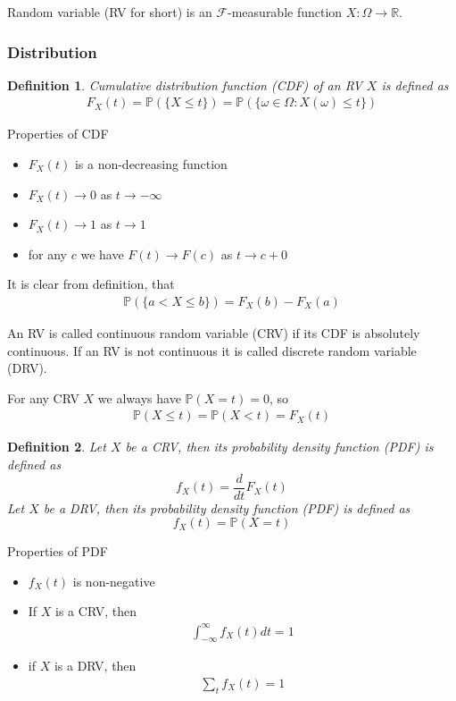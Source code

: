 \documentclass[10pt]{article}
\newtheorem*{definition}{Definition}
\begin{document}
Random variable (RV for short) is an $\mathcal{F}$-measurable function $X:\Omega\to\mathbb{R}$.

\subsubsection{Distribution}

\begin{definition} Cumulative distribution function (CDF) of an RV $X$ is defined as
\begin{align}
F_X(t)=\mathbb{P}(\{X\leq t\})=\mathbb{P}(\{\omega\in\Omega:X(\omega)\leq t\})
\end{align}
\end{definition}

Properties of CDF

\begin{itemize}
\item $F_X(t)$ is a non-decreasing function
\item $F_X(t)\to 0$ as $t\to-\infty$
\item $F_X(t)\to 1$ as $t\to 1$
\item for any $c$ we have $F(t)\to F(c)$ as $t\to c+0$
\end{itemize}

It is clear from definition, that
\begin{align}
\mathbb{P}(\{a< X\leq b\})=F_X(b)-F_X(a)
\end{align}

An RV is called continuous random variable (CRV) if its CDF is absolutely continuous. If an RV is not continuous it is called discrete random variable (DRV).

For any CRV $X$ we always have $\mathbb{P}(X=t)=0$, so
\begin{align}
\mathbb{P}(X\leq t)=\mathbb{P}(X<t)=F_X(t)
\end{align}

\begin{definition}
Let $X$ be a CRV, then its probability density function (PDF) is defined as
$$
f_X(t)=\frac{d}{dt}F_X(t)
$$
Let $X$ be a DRV, then its probability density function (PDF) is defined as
$$
f_X(t)=\mathbb{P}(X=t)
$$
\end{definition}

Properties of PDF
\begin{itemize}
\item $f_X(t)$ is non-negative
\item If $X$ is a CRV, then
\begin{align}
\int_{-\infty}^\infty f_X(t)dt=1
\end{align}
\item if $X$ is a DRV, then
\begin{align}
\sum_{t} f_X(t)=1
\end{align}
\end{itemize}
\end{document}
